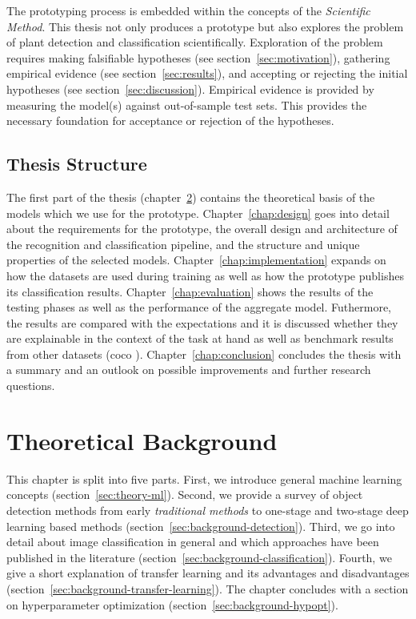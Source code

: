 \documentclass[final]{vutinfth} %
\begin{document}
The prototyping process is embedded within the concepts of the
\emph{Scientific Method}. This thesis not only produces a prototype
but also explores the problem of plant detection and classification
scientifically. Exploration of the problem requires making falsifiable
hypotheses (see section~\ref{sec:motivation}), gathering empirical
evidence (see section~\ref{sec:results}), and accepting or rejecting
the initial hypotheses (see section~\ref{sec:discussion}). Empirical
evidence is provided by measuring the model(s) against out-of-sample
test sets. This provides the necessary foundation for acceptance or
rejection of the hypotheses.

\section{Thesis Structure}
\label{sec:structure}

The first part of the thesis (chapter~\ref{chap:background}) contains
the theoretical basis of the models which we use for the
prototype. Chapter~\ref{chap:design} goes into detail about the
requirements for the prototype, the overall design and architecture of
the recognition and classification pipeline, and the structure and
unique properties of the selected
models. Chapter~\ref{chap:implementation} expands on how the datasets
are used during training as well as how the prototype publishes its
classification results. Chapter~\ref{chap:evaluation} shows the
results of the testing phases as well as the performance of the
aggregate model. Futhermore, the results are compared with the
expectations and it is discussed whether they are explainable in the
context of the task at hand as well as benchmark results from other
datasets (\gls{coco} \cite{lin2015}). Chapter~\ref{chap:conclusion}
concludes the thesis with a summary and an outlook on possible
improvements and further research questions.

\chapter{Theoretical Background}
\label{chap:background}

This chapter is split into five parts. First, we introduce general
machine learning concepts (section~\ref{sec:theory-ml}). Second, we
provide a survey of object detection methods from early
\emph{traditional methods} to one-stage and two-stage deep learning
based methods (section~\ref{sec:background-detection}). Third, we go
into detail about image classification in general and which approaches
have been published in the literature
(section~\ref{sec:background-classification}). Fourth, we give a short
explanation of transfer learning and its advantages and disadvantages
(section~\ref{sec:background-transfer-learning}). The chapter
concludes with a section on hyperparameter optimization
(section~\ref{sec:background-hypopt}).
\end{document}
